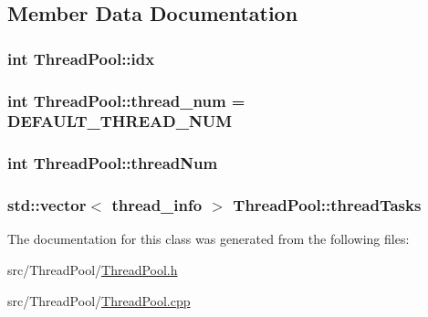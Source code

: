 \subsection{Member Data Documentation}
\hypertarget{class_thread_pool_a96d38c2d5e24c7ae9d01746ceafecb6b}{
\subsubsection[{idx}]{\setlength{\rightskip}{0pt plus 5cm}int Thread\+Pool\+::idx\hspace{0.3cm}{\ttfamily [private]}}}\label{class_thread_pool_a96d38c2d5e24c7ae9d01746ceafecb6b}
\hypertarget{class_thread_pool_a2bde4887496aa925585e188eb83cd2ee}{
\subsubsection[{thread\+\_\+num}]{\setlength{\rightskip}{0pt plus 5cm}int Thread\+Pool\+::thread\+\_\+num = {\bf D\+E\+F\+A\+U\+L\+T\+\_\+\+T\+H\+R\+E\+A\+D\+\_\+\+N\+U\+M}\hspace{0.3cm}{\ttfamily [static]}}}\label{class_thread_pool_a2bde4887496aa925585e188eb83cd2ee}
\hypertarget{class_thread_pool_a080caea6c49348371e9ade20593da05d}{
\subsubsection[{thread\+Num}]{\setlength{\rightskip}{0pt plus 5cm}int Thread\+Pool\+::thread\+Num\hspace{0.3cm}{\ttfamily [private]}}}\label{class_thread_pool_a080caea6c49348371e9ade20593da05d}
\hypertarget{class_thread_pool_acf827848f2f1da0a2e56309cc4359177}{
\subsubsection[{thread\+Tasks}]{\setlength{\rightskip}{0pt plus 5cm}std\+::vector$<$ {\bf thread\+\_\+info} $>$ Thread\+Pool\+::thread\+Tasks\hspace{0.3cm}{\ttfamily [private]}}}\label{class_thread_pool_acf827848f2f1da0a2e56309cc4359177}


The documentation for this class was generated from the following files\+:\begin{DoxyCompactItemize}
\item 
src/\+Thread\+Pool/\hyperlink{_thread_pool_8h}{Thread\+Pool.\+h}\item 
src/\+Thread\+Pool/\hyperlink{_thread_pool_8cpp}{Thread\+Pool.\+cpp}\end{DoxyCompactItemize}
